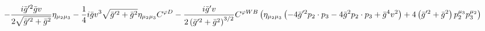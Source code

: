 %
\begin{dmath*}
%
  -  \frac{i {\bar g}^{\prime 2} {\bar g}{} v}{2 \sqrt{{\bar g}^{\prime 2} + {\bar g}{}^2}}\eta_{\mu_2 \mu_3}  -  \frac{1}{4} i {\bar g}{} v^3 \sqrt{{\bar g}^{\prime 2} + {\bar g}{}^2}\eta_{\mu_2 \mu_3} C^{ \varphi  D}  -  \frac{i {\bar g}^\prime v}{2 \left({\bar g}^{\prime 2} + {\bar g}{}^2\right)^{3/2}}C^{ \varphi  WB} \left(\eta_{\mu_2 \mu_3} \left( - 4 {\bar g}^{\prime 2} p_{2}\nobreak\cdot\nobreak{}p_{3} - 4 {\bar g}{}^2 p_{2}\nobreak\cdot\nobreak{}p_{3} + {\bar g}{}^4 v^2\right) + 4 \left({\bar g}^{\prime 2} + {\bar g}{}^2\right) p_2^{\mu_3} p_3^{\mu_2}\right)
%
\end{dmath*}
%

